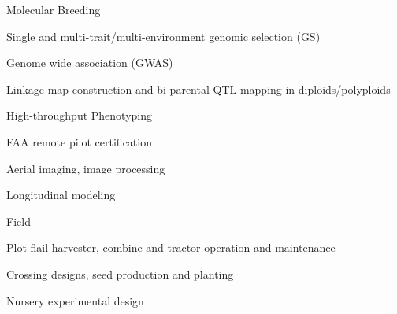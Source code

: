 \documentclass[10pt]{article}
\newcommand{\halfblankline}{\quad\vspace{-0.5\baselineskip}\pagebreak[3]}
\begin{document}


\halfblankline

Molecular Breeding
%
\begin{innerlist}
    \item Single and multi-trait/multi-environment genomic selection (GS)
	\item Genome wide association (GWAS)
	\item Linkage map construction and bi-parental QTL mapping in diploids/polyploids
\end{innerlist}

\halfblankline 

High-throughput Phenotyping
\begin{innerlist}
\item FAA remote pilot certification
\item Aerial imaging, image processing 
\item Longitudinal modeling 
\end{innerlist}

\halfblankline

Field
%
\begin{innerlist}
\item Plot flail harvester, combine and tractor operation and maintenance
\item Crossing designs, seed production and planting 
\item Nursery experimental design
\end{innerlist}
\end{document}
